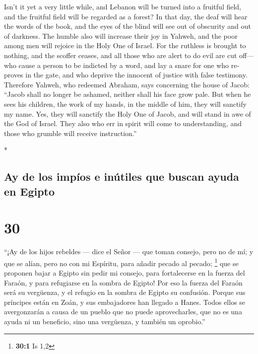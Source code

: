 \begin{paracol}{2}
\begin{otherlanguage}{english}
 Isn't it yet a very little while, and Lebanon will be
turned into a fruitful field, and the fruitful field will be regarded as
a forest?  In that day, the deaf will hear the words of
the book, and the eyes of the blind will see out of obscurity and out of
darkness.  The humble also will increase their joy in
Yahweh, and the poor among men will rejoice in the Holy One of Israel.
 For the ruthless is brought to nothing, and the scoffer
ceases, and all those who are alert to do evil are cut off---
 who cause a person to be indicted by a word, and lay a
snare for one who reproves in the gate, and who deprive the innocent of
justice with false testimony.  Therefore Yahweh, who
redeemed Abraham, says concerning the house of Jacob: ``Jacob shall no
longer be ashamed, neither shall his face grow pale.  But
when he sees his children, the work of my hands, in the middle of him,
they will sanctify my name. Yes, they will sanctify the Holy One of
Jacob, and will stand in awe of the God of Israel.  They
also who err in spirit will come to understanding, and those who grumble
will receive instruction.''

\end{otherlanguage}

\switchcolumn[0]*

\hypertarget{ay-de-los-impuxedos-e-inuxfatiles-que-buscan-ayuda-en-egipto}{%
\subsection{Ay de los impíos e inútiles que buscan ayuda en
Egipto}\label{ay-de-los-impuxedos-e-inuxfatiles-que-buscan-ayuda-en-egipto}}

\hypertarget{section-58}{%
\section{30}\label{section-58}}

 ``¡Ay de los hijos rebeldes --- dice el Señor --- que
toman consejo, pero no de mí; y que se alían, pero no con mi Espíritu,
para añadir pecado al pecado; \footnote{\textbf{30:1} Is 1,2}
 que se proponen bajar a Egipto sin pedir mi consejo, para
fortalecerse en la fuerza del Faraón, y para refugiarse en la sombra de
Egipto!  Por eso la fuerza del Faraón será su vergüenza, y
el refugio en la sombra de Egipto su confusión.  Porque
sus príncipes están en Zoán, y sus embajadores han llegado a Hanes.
 Todos ellos se avergonzarán a causa de un pueblo que no
puede aprovecharles, que no es una ayuda ni un beneficio, sino una
vergüenza, y también un oprobio.''


\end{paracol}
